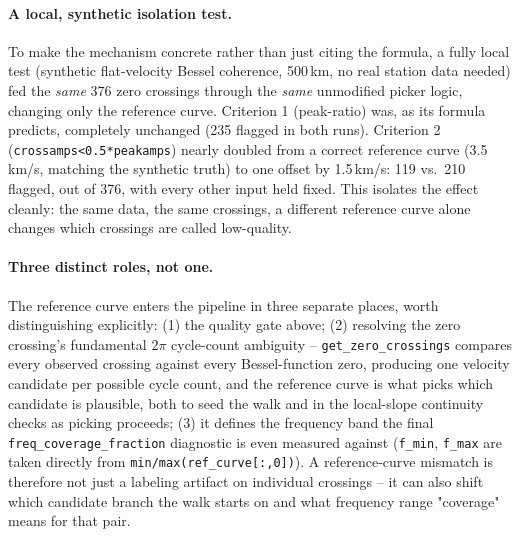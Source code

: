 \documentclass[11pt]{article}
\begin{document}
\paragraph{A local, synthetic isolation test.} To make the mechanism concrete rather than just
citing the formula, a fully local test (synthetic flat-velocity Bessel coherence, 500\,km, no real
station data needed) fed the \emph{same} 376 zero crossings through the \emph{same} unmodified
picker logic, changing only the reference curve. Criterion 1 (peak-ratio) was, as its formula
predicts, completely unchanged (235 flagged in both runs). Criterion 2
(\texttt{crossamps<0.5*peakamps}) nearly doubled from a correct reference curve (3.5\,km/s,
matching the synthetic truth) to one offset by 1.5\,km/s: 119 vs.\ 210 flagged, out of 376, with
every other input held fixed. This isolates the effect cleanly: the same data, the same crossings,
a different reference curve alone changes which crossings are called low-quality.

\paragraph{Three distinct roles, not one.} The reference curve enters the pipeline in three
separate places, worth distinguishing explicitly: (1) the quality gate above; (2) resolving the
zero crossing's fundamental $2\pi$ cycle-count ambiguity -- \texttt{get\_zero\_crossings} compares
every observed crossing against every Bessel-function zero, producing one velocity candidate per
possible cycle count, and the reference curve is what picks which candidate is plausible, both to
seed the walk and in the local-slope continuity checks as picking proceeds; (3) it defines the
frequency band the final \texttt{freq\_coverage\_fraction} diagnostic is even measured against
(\texttt{f\_min}, \texttt{f\_max} are taken directly from \texttt{min/max(ref\_curve[:,0])}). A
reference-curve mismatch is therefore not just a labeling artifact on individual crossings -- it
can also shift which candidate branch the walk starts on and what frequency range "coverage" means
for that pair.
\end{document}
